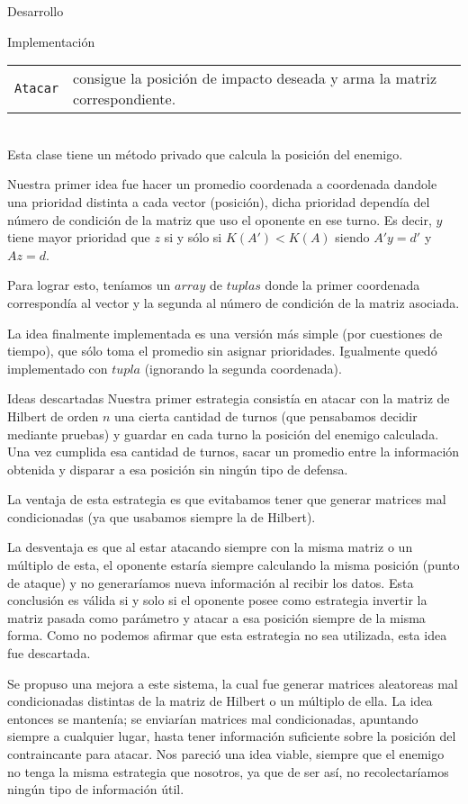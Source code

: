 \begin{section}{Desarrollo}
\begin{subsection}{Implementación}
		\begin{tabular}{rl}
			\texttt{Atacar} & consigue la posición de impacto deseada y arma la matriz correspondiente.\\
		\end{tabular}\\
		
		Esta clase tiene un método privado que calcula la posición del enemigo.
		
		Nuestra primer idea fue hacer un promedio coordenada a coordenada dandole una prioridad distinta a cada vector (posición), dicha prioridad dependía del número de condición de la matriz que uso el oponente en ese turno. Es decir, $y$ tiene mayor prioridad que $z$ si y sólo si $K(A')<K(A)$ siendo $A'y=d'$ y $Az=d$.
		
		Para lograr esto, teníamos un $array$ de $tuplas$ donde la primer coordenada correspondía al vector y la segunda al número de condición de la matriz asociada.
		
		La idea finalmente implementada es una versión más simple (por cuestiones de tiempo), que sólo toma el promedio sin asignar prioridades. Igualmente quedó implementado con $tupla$ (ignorando la segunda coordenada).
	\end{subsection}
	\begin{subsection}{Ideas descartadas}
		Nuestra primer estrategia consistía en atacar con la matriz de Hilbert de orden $n$ una cierta cantidad de turnos (que pensabamos decidir mediante pruebas) y guardar en cada turno la posición del enemigo calculada. Una vez cumplida esa cantidad de turnos, sacar un promedio entre la información obtenida y disparar a esa posición sin ningún tipo de defensa.
		
		La ventaja de esta estrategia es que evitabamos tener que generar matrices mal condicionadas (ya que usabamos siempre la de Hilbert).
		
		La desventaja es que al estar atacando siempre con la misma matriz o un múltiplo de esta, el oponente estaría siempre calculando la misma posición (punto de ataque) y no generaríamos nueva información al recibir los datos. Esta conclusión es válida si y solo si el oponente posee como estrategia invertir la matriz pasada como parámetro y atacar a esa posición siempre de la misma forma. Como no podemos afirmar que esta estrategia no sea utilizada, esta idea fue descartada.
		
		Se propuso una mejora a este sistema, la cual fue generar matrices aleatoreas mal condicionadas distintas de la matriz de Hilbert o un múltiplo de ella. La idea entonces se mantenía; se enviarían matrices mal condicionadas, apuntando siempre a cualquier lugar, hasta tener información suficiente sobre la posición del contraincante para atacar. Nos pareció una idea viable, siempre que el enemigo no tenga la misma estrategia que nosotros, ya que de ser así, no recolectaríamos ningún tipo de información útil.
		

\end{subsection}
\end{section}
